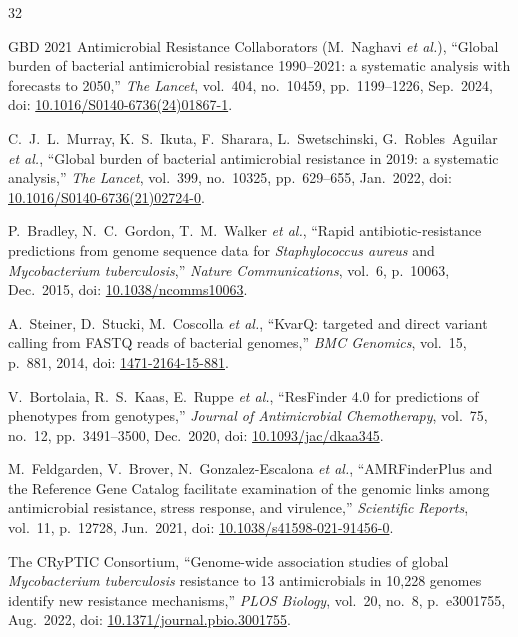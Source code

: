 \documentclass[conference]{IEEEtran}
\begin{document}
\begin{thebibliography}{32}

GBD 2021 Antimicrobial Resistance Collaborators (M.~Naghavi \textit{et al.}),
``Global burden of bacterial antimicrobial resistance 1990--2021:
a systematic analysis with forecasts to 2050,''
\textit{The Lancet}, vol.~404, no.~10459, pp.~1199--1226, Sep.\ 2024,
doi: \href{https://doi.org/10.1016/S0140-6736(24)01867-1}{10.1016/S0140-6736(24)01867-1}.

C.~J.~L.~Murray, K.~S.~Ikuta, F.~Sharara, L.~Swetschinski,
G.~Robles~Aguilar \textit{et al.},
``Global burden of bacterial antimicrobial resistance in 2019:
a systematic analysis,''
\textit{The Lancet}, vol.~399, no.~10325, pp.~629--655, Jan.\ 2022,
doi: \href{https://doi.org/10.1016/S0140-6736(21)02724-0}{10.1016/S0140-6736(21)02724-0}.

P.~Bradley, N.~C.~Gordon, T.~M.~Walker \textit{et al.},
``Rapid antibiotic-resistance predictions from genome sequence data for
\textit{Staphylococcus aureus} and \textit{Mycobacterium tuberculosis},''
\textit{Nature Communications}, vol.~6, p.~10063, Dec.\ 2015,
doi: \href{https://doi.org/10.1038/ncomms10063}{10.1038/ncomms10063}.

A.~Steiner, D.~Stucki, M.~Coscolla \textit{et al.},
``KvarQ: targeted and direct variant calling from FASTQ reads of
bacterial genomes,''
\textit{BMC Genomics}, vol.~15, p.~881, 2014,
doi: \href{https://doi.org/10.1186/1471-2164-15-881}{1471-2164-15-881}.

V.~Bortolaia, R.~S.~Kaas, E.~Ruppe \textit{et al.},
``ResFinder 4.0 for predictions of phenotypes from genotypes,''
\textit{Journal of Antimicrobial Chemotherapy}, vol.~75, no.~12,
pp.~3491--3500, Dec.\ 2020,
doi: \href{https://doi.org/10.1093/jac/dkaa345}{10.1093/jac/dkaa345}.

M.~Feldgarden, V.~Brover, N.~Gonzalez-Escalona \textit{et al.},
``AMRFinderPlus and the Reference Gene Catalog facilitate examination of
the genomic links among antimicrobial resistance, stress response, and
virulence,''
\textit{Scientific Reports}, vol.~11, p.~12728, Jun.\ 2021,
doi: \href{https://doi.org/10.1038/s41598-021-91456-0}{10.1038/s41598-021-91456-0}.

The CRyPTIC Consortium,
``Genome-wide association studies of global \textit{Mycobacterium
tuberculosis} resistance to 13 antimicrobials in 10,228 genomes identify
new resistance mechanisms,''
\textit{PLOS Biology}, vol.~20, no.~8, p.~e3001755, Aug.\ 2022,
doi: \href{https://doi.org/10.1371/journal.pbio.3001755}{10.1371/journal.pbio.3001755}.


\end{thebibliography}
\end{document}
